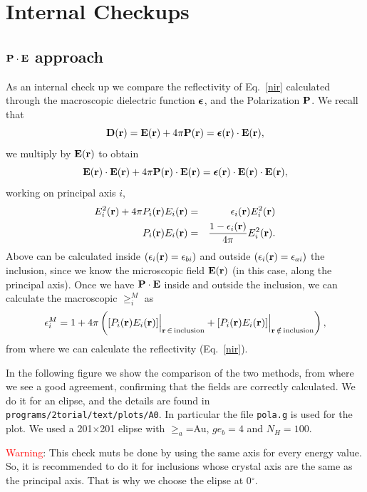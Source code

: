 \documentclass[preprint,12pt]{revtex4}
\begin{document}
\section{Internal Checkups}

\subsection{$\mathbf{P}\cdot\mathbf{E}$ approach}
As an internal check up we compare the reflectivity of Eq.~\ref{nir}
calculated through the macroscopic dielectric function $\boldsymbol{\epsilon}$, and
the Polarization $\mathbf{P}$. We recall that 
\begin{equation}\label{pol1}
\mathbf{D}(\mathbf{r})=\mathbf{E}(\mathbf{r})+4\pi\mathbf{P}(\mathbf{r})=\boldsymbol{\epsilon}(\mathbf{r})\cdot\mathbf{E}(\mathbf{r})
,
\end{equation} 
we multiply by $\mathbf{E}(\mathbf{r})$ to obtain
\begin{equation}\label{pol2}
\mathbf{E}(\mathbf{r}) \cdot\mathbf{E}(\mathbf{r})
+4\pi\mathbf{P}(\mathbf{r}) \cdot\mathbf{E}(\mathbf{r})=\boldsymbol{\epsilon}(\mathbf{r})\cdot\mathbf{E}(\mathbf{r}) \cdot\mathbf{E}(\mathbf{r})
,
\end{equation} 
working on principal axis $i$,
\begin{eqnarray}\label{pol3}
E_i^2(\mathbf{r})
+4\pi P_i(\mathbf{r})E_i(\mathbf{r})&=&\epsilon_i(\mathbf{r})E_i^2(\mathbf{r})
\nonumber\\
P_i(\mathbf{r})E_i(\mathbf{r})
&=&\frac{1-\epsilon_i(\mathbf{r})}{4\pi}E_i^2(\mathbf{r})
.
\end{eqnarray}
Above can be calculated inside $(\epsilon_i(\mathbf{r})=\epsilon_{bi})$
and outside $(\epsilon_i(\mathbf{r})=\epsilon_{ai})$ the inclusion, since we know the
microscopic field $\mathbf{E}(\mathbf{r})$ (in this case, along the principal
axis). Once we have $\mathbf{P}\cdot\mathbf{E}$ inside and outside the inclusion,
we can calculate the macroscopic $\ge_i^M$ as
\begin{equation}\label{pol4}
\epsilon_i^M=1+4\pi \left([P_i(\mathbf{r})E_i(\mathbf{r})]\Big|_{\mathbf{r}\,\in\,\mathrm{inclusion}}
+[P_i(\mathbf{r})E_i(\mathbf{r})]\Big|_{\mathbf{r}\,\notin\,\mathrm{inclusion}}\right)
,
\end{equation} 
from where we can calculate the reflectivity (Eq.~\ref{nir}).

In the following figure we show the comparison of the two methods,
from where we see a good agreement, confirming that the fields are
correctly calculated. We
do it for an elipse, and the details are found in 
\verb=programs/2torial/text/plots/A0=. In particular the file
\verb=pola.g= is used for the plot. We used a 201$\times$201 elipse
with $\ge_a$=Au, $ge_b=4$ and $N_H=100$.

\textcolor{red}{Warning}: This check muts be done by using the same
axis for every energy value. So, it is recommended to do it for
inclusions whose crystal axis are the same as the principal axis.
That is why we choose the elipse at 0$^\circ$. 
\end{document}
